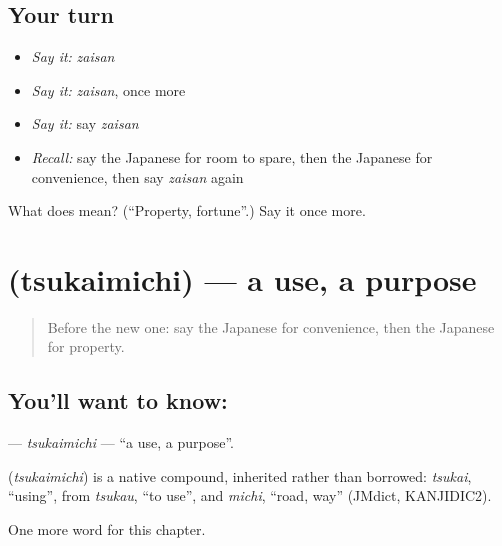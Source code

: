 \subsection*{Your turn}
\begin{itemize}
\raggedright
  \item \emph{Say it:} \emph{zaisan}
  \item \emph{Say it:} \emph{zaisan}, once more
  \item \emph{Say it:} say \emph{zaisan}
  \item \emph{Recall:} say the Japanese for room to spare, then the Japanese for convenience, then say \emph{zaisan} again
\end{itemize}

\begin{tcolorbox}[breakable,colback=teal!4,colframe=teal!35!black,title={Before you move on}]
What does  mean? (\textquotedblleft{}Property, fortune\textquotedblright{}.) Say it once more.
\end{tcolorbox}
\section[\texorpdfstring{\ja{つかいみち} (tsukaimichi)}{つかいみち (tsukaimichi)}]{ (tsukaimichi) — a use, a purpose}

\label{lesson:JA-C97-tsukaimichi}



\begin{quote}
Before the new one: say the Japanese for convenience, then the Japanese for property.
\end{quote}

\subsection*{You'll want to know: }
\textbf{} — \emph{tsukaimichi} — \textquotedblleft{}a use, a purpose\textquotedblright{}.

\begin{cousinweb}
\textbf{} (\emph{tsukaimichi}) is a native compound, inherited rather than borrowed: \emph{tsukai}, \textquotedblleft{}using\textquotedblright{}, from \emph{tsukau}, \textquotedblleft{}to use\textquotedblright{}, and \emph{michi}, \textquotedblleft{}road, way\textquotedblright{} (JMdict, KANJIDIC2).
\end{cousinweb}

\begin{grammarlens}[title={What you've built}]
One more word for this chapter.
\end{grammarlens}

